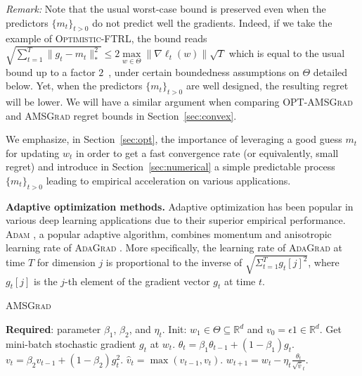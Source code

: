 \documentclass[twoside]{article}
\begin{document}
\textit{Remark:} Note that the usual worst-case bound is preserved even when the predictors $\{m_{t}\}_{t>0}$ do not predict well the gradients. Indeed, if we take the example of \textsc{Optimistic-FTRL}, the bound reads $\sqrt{\sum_{t=1}^T \| g_t - m_t \|_*^2 } \leq 2 \max \limits_{w \in \Theta} \| \nabla \ell_t(w) \| \sqrt{T}$ which is equal to the usual bound up to a factor $2$~\citep{RS13b}, under certain boundedness assumptions on $\Theta$ detailed below.
Yet, when the predictors $\{m_{t}\}_{t>0}$ are well designed, the resulting regret will be lower. 
We will have a similar argument when comparing \textsc{OPT-AMSGrad} and \textsc{AMSGrad} regret bounds in Section~\ref{sec:convex}.

We emphasize, in Section~\ref{sec:opt}, the importance of leveraging a good guess $m_t$ for updating $w_t$ in order to get a fast convergence rate (or equivalently, small regret) and introduce in Section~\ref{sec:numerical} a simple predictable process $\{m_{t}\}_{t>0}$ leading to empirical acceleration on various applications.

\textbf{Adaptive optimization methods.}\hspace{0.1cm}
Adaptive optimization has been popular in various deep learning applications due to their superior empirical performance.
\textsc{Adam} \citep{KB15}, a popular adaptive algorithm, combines momentum \citep{P64} and anisotropic learning rate of \textsc{AdaGrad} \citep{DHS11}.
More specifically, the learning rate of \textsc{AdaGrad} at time $T$ for dimension $j$ is proportional to the inverse of $\sqrt{ \Sigma_{t=1}^T g_t[j]^2 }$, where $g_t[j]$ is the $j$-th element of the gradient vector $g_t$ at time $t$.


\begin{algorithm}[H]
\caption{\textsc{AMSGrad} \citep{RKK18}} \label{alg:amsgrad}
\begin{algorithmic}[1]
\small
\STATE \textbf{Required}: parameter $\beta_1$, $\beta_2$, and $\eta_t$. 
\STATE Init: $w_{1} \in \Theta \subseteq \mathbb R^d $ and $v_{0} = \epsilon 1 \in \mathbb R^{d}$.
\STATE Get mini-batch stochastic gradient $g_t$ at $w_t$.
\STATE $\theta_t = \beta_1 \theta_{t-1} + (1 - \beta_1) g_t$.
\STATE $v_t = \beta_2 v_{t-1} + (1 - \beta_2) g_t^2$. 
\STATE \label{line:maxop}$\hat{v}_t = \max( \hat{v}_{t-1} , v_t )$. 
\STATE $w_{t+1} = w_t - \eta_t \frac{\theta_t}{ \sqrt{\hat{v}}_t }$.
\ENDFOR
\end{algorithmic}
\end{algorithm}\vspace{-0.1in}
\end{document}
